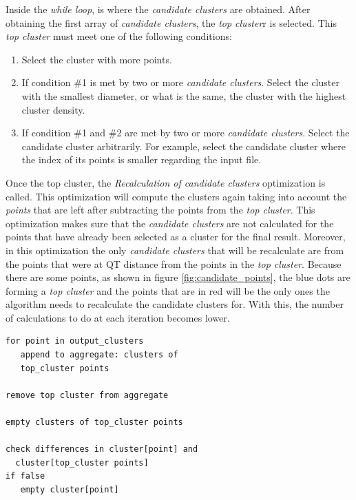 \noindent Inside the \textit{while loop}, is where the \textit{candidate clusters} are obtained. After obtaining the first array of \textit{candidate clusters}, the \textit{top cluster}r is selected. This \textit{top cluster} must meet one of the following conditions:

\begin{enumerate}
    \item Select the cluster with more points.
    \item If condition \#1 is met by two or more \textit{candidate clusters}. Select the cluster with the smallest diameter, or what is the same, the cluster with the highest cluster density. 
    \item If condition \#1 and \#2 are met by two or more \textit{candidate clusters}. Select the candidate cluster arbitrarily. For example, select the candidate cluster where the index of its points is smaller regarding the input file.
\end{enumerate}

\noindent Once the top cluster, the \textit{Recalculation of candidate clusters} optimization is called. This optimization will compute the clusters again taking into account the \textit{points} that are left after subtracting the points from the \textit{top cluster}. This optimization makes sure that the \textit{candidate clusters} are not calculated for the points that have already been selected as a cluster for the final result. Moreover, in this optimization the only \textit{candidate clusters} that will be recalculate are from the points that were at QT distance from the points in the \textit{top cluster}. Because there are some points, as shown in figure \ref{fig:candidate_points}, the blue dots are forming a \textit{top cluster} and the points that are in red will be the only ones the algorithm needs to recalculate the candidate clusters for. With this, the number of calculations to do at each iteration becomes lower. 

\begin{verbatim}
for point in output_clusters
   append to aggregate: clusters of 
   top_cluster points

remove top cluster from aggregate
	
empty clusters of top_cluster points

check differences in cluster[point] and 
  cluster[top_cluster points]
if false
   empty cluster[point]
\end{verbatim}

